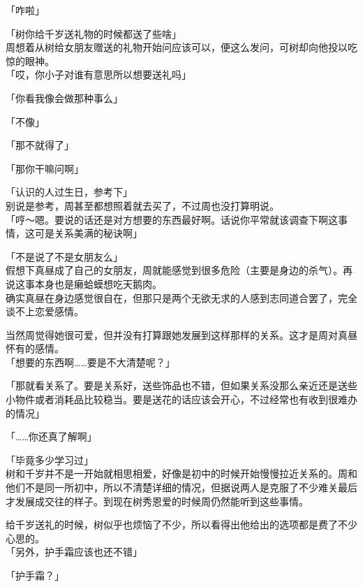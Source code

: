 「咋啦」

「树你给千岁送礼物的时候都送了些啥」\\

周想着从树给女朋友赠送的礼物开始问应该可以，便这么发问，可树却向他投以吃惊的眼神。\\

「哎，你小子对谁有意思所以想要送礼吗」

「你看我像会做那种事么」

「不像」

「那不就得了」

「那你干嘛问啊」

「认识的人过生日，参考下」\\

别说是参考，周甚至都想照着就去买了，不过周也没打算明说。\\

「哼～嗯。要说的话还是对方想要的东西最好啊。话说你平常就该调查下啊这事情，这可是关系美满的秘诀啊」

「不是说了不是女朋友么」\\

假想下真昼成了自己的女朋友，周就能感觉到很多危险（主要是身边的杀气）。再说这事本身也是癞蛤蟆想吃天鹅肉。\\

确实真昼在身边感觉很自在，但那只是两个无欲无求的人感到志同道合罢了，完全谈不上恋爱感情。

当然周觉得她很可爱，但并没有打算跟她发展到这样那样的关系。这才是周对真昼怀有的感情。\\

「想要的东西啊……要是不大清楚呢？」

「那就看关系了。要是关系好，送些饰品也不错，但如果关系没那么亲近还是送些小物件或者消耗品比较稳当。要是送花的话应该会开心，不过经常也有收到很难办的情况」

「……你还真了解啊」

「毕竟多少学习过」\\

树和千岁并不是一开始就相思相爱，好像是初中的时候开始慢慢拉近关系的。周和他们不是同一所初中，所以不清楚详细的情况，但据说两人是克服了不少难关最后才发展成交往的样子。到现在树秀恩爱的时候周仍然能听到这些事情。

给千岁送礼的时候，树似乎也烦恼了不少，所以看得出他给出的选项都是费了不少心思的。\\

「另外，护手霜应该也还不错」

「护手霜？」\\

